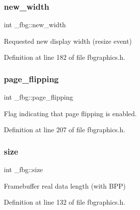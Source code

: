 \mbox{\label{struct__fbg_a95859bd418a5cfff155cdb1421d295ef}} 
\subsubsection{\texorpdfstring{new\+\_\+width}{new\_width}}
{\footnotesize\ttfamily int \+\_\+fbg\+::new\+\_\+width}



Requested new display width (resize event) 



Definition at line 182 of file fbgraphics.\+h.

\mbox{\label{struct__fbg_ad32509bca6ac4fb467476834cb8ce9d2}} 
\subsubsection{\texorpdfstring{page\+\_\+flipping}{page\_flipping}}
{\footnotesize\ttfamily int \+\_\+fbg\+::page\+\_\+flipping}



Flag indicating that page flipping is enabled. 



Definition at line 207 of file fbgraphics.\+h.

\mbox{\label{struct__fbg_a84fb220d4804cba22176997898e75b73}} 
\subsubsection{\texorpdfstring{size}{size}}
{\footnotesize\ttfamily int \+\_\+fbg\+::size}



Framebuffer real data length (with B\+PP) 



Definition at line 132 of file fbgraphics.\+h.

\mbox{\label{struct__fbg_a0463af9bf583afe770b822c1fbb9a24d}} 
